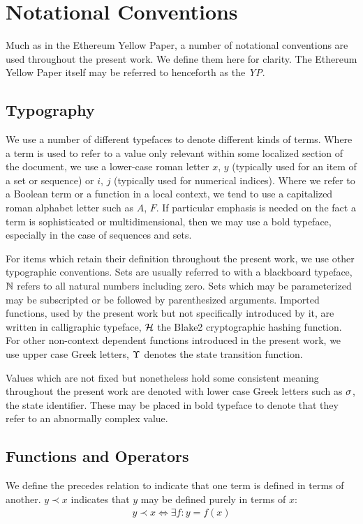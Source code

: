 \section{Notational Conventions}\label{sec:notation}

Much as in the Ethereum Yellow Paper, a number of notational conventions are used throughout the present work. We define them here for clarity. The Ethereum Yellow Paper itself may be referred to henceforth as the \emph{YP}.

\subsection{Typography}\label{sec:typography}

We use a number of different typefaces to denote different kinds of terms. Where a term is used to refer to a value only relevant within some localized section of the document, we use a lower-case roman letter \eg $x$, $y$ (typically used for an item of a set or sequence) or \eg $i$, $j$ (typically used for numerical indices). Where we refer to a Boolean term or a function in a local context, we tend to use a capitalized roman alphabet letter such as $A$, $F$. If particular emphasis is needed on the fact a term is sophisticated or multidimensional, then we may use a bold typeface, especially in the case of sequences and sets.

For items which retain their definition throughout the present work, we use other typographic conventions. Sets are usually referred to with a blackboard typeface, \eg $\mathbb{N}$ refers to all natural numbers including zero. Sets which may be parameterized may be subscripted or be followed by parenthesized arguments. Imported functions, used by the present work but not specifically introduced by it, are written in calligraphic typeface, \eg $\mathcal{H}$ the Blake2 cryptographic hashing function. For other non-context dependent functions introduced in the present work, we use upper case Greek letters, \eg $\Upsilon$ denotes the state transition function.

Values which are not fixed but nonetheless hold some consistent meaning throughout the present work are denoted with lower case Greek letters such as $\sigma$, the state identifier. These may be placed in bold typeface to denote that they refer to an abnormally complex value.

\subsection{Functions and Operators}\label{sec:functions}
We define the precedes relation to indicate that one term is defined in terms of another. \Eg $y \prec x$ indicates that $y$ may be defined purely in terms of $x$:
\begin{align}\label{eq:precedes}
  y \prec x \Longleftrightarrow \exists f: y = f(x)
\end{align}

